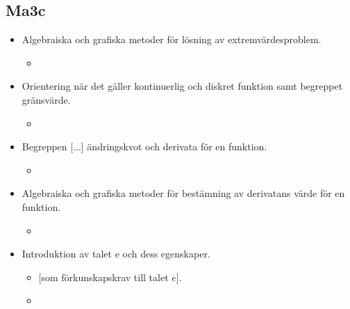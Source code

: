\subsection*{Ma3c}
\begin{itemize}
\item Algebraiska och grafiska metoder för lösning av extremvärdesproblem.
	\begin{itemize}
	\item {}
	\end{itemize}
\item Orientering när det gäller kontinuerlig och diskret funktion samt begreppet gränsvärde.
	\begin{itemize}
	\item {}
	\end{itemize}
\item Begreppen [...] ändringskvot och derivata för en funktion.
	\begin{itemize}
	\item {}
	\end{itemize}
\item Algebraiska och grafiska metoder för bestämning av derivatans värde för en funktion.
	\begin{itemize}
	\item {}
	\end{itemize}
\item Introduktion av talet e och dess egenskaper.
	\begin{itemize}
	\item {} {\color{myBlue}[som förkunskapskrav till talet $e$].}
	\item {}
	\end{itemize}
\end{itemize}
